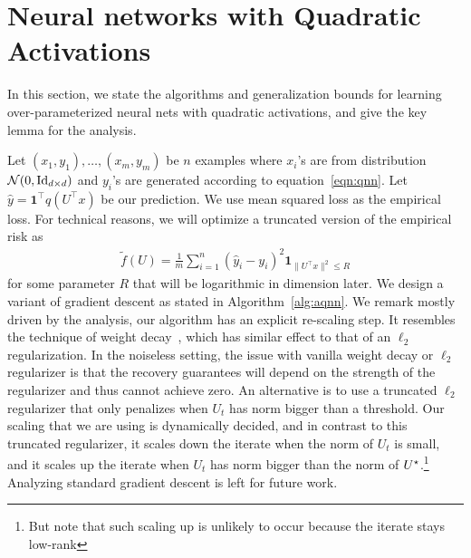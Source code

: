  \section{Neural networks with Quadratic Activations}\label{sec:quadratic}
 
In this section, we state the algorithms and generalization bounds for learning over-parameterized neural nets with quadratic activations, and give the key lemma for the analysis. 

Let $(x_1, y_1),\dots, (x_m, y_m)$ be $n$ examples where $x_i$'s are from distribution $\mathcal{N}(0, \operatorname{Id}_{d\times d})$ and $y_i$'s are generated according to equation~\eqref{eqn:qnn}. 
Let  $\hat{y} = \mathbf{1}^\top q(U^\top x)$
be our prediction. We use mean squared loss as the empirical loss. 
For technical reasons, we will optimize a truncated version of the empirical risk as
\begin{align*}
 \tilde{f}(U) = \frac{1}{m}\sum_{i=1}^{n} (\hat{y}_i-y_i)^2\mathbf{1}_{\|U^\top x\|^2\le R}
\end{align*}
for some parameter $R$ that will be logarithmic in dimension later.  We design a variant of gradient descent as stated in Algorithm~\ref{alg:aqnn}.
We remark mostly driven by the analysis, our algorithm has an explicit re-scaling step. It resembles the technique of weight decay~\cite{krogh1992simple}, which has similar effect to that of an $\ell_2$ regularization. In the noiseless setting, the issue with vanilla weight decay or $\ell_2$ regularizer is that the recovery guarantees will depend on the strength of the regularizer and thus cannot achieve zero. An alternative is to use a truncated $\ell_2$ regularizer  that only penalizes when $U_t$ has norm bigger than a threshold. 
Our scaling that we are using is dynamically decided, and in contrast to this truncated regularizer, it scales down the iterate when the norm of $U_t$ is small, and it scales up the iterate when $U_t$ has norm bigger than the norm of ${{U}^\star}$.\footnote{But note that such scaling up is unlikely to occur because the iterate stays low-rank} Analyzing standard gradient descent is left for future work. 

